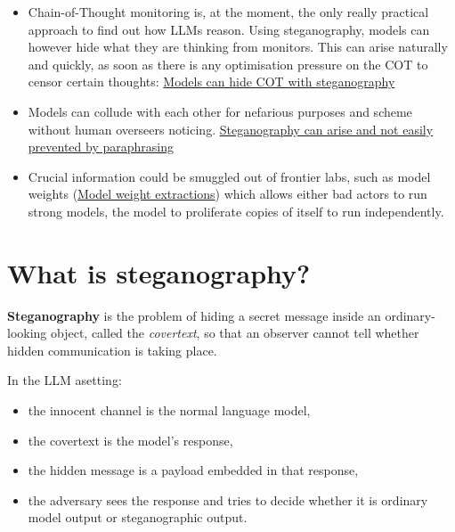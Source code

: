 \documentclass[11pt]{article}
\begin{document}
\begin{itemize}
  \item Chain-of-Thought monitoring is, at the moment, the only really
        practical approach to find out how LLMs reason. Using steganography,
        models can however hide what they are thinking from monitors. This can
        arise naturally and quickly, as soon as there is any optimisation
        pressure on the COT to censor certain thoughts:
        \href{https://arxiv.org/html/2506.01926v2}{Models can hide COT with
        steganography}
  \item Models can collude with each other for nefarious purposes and scheme
        without human overseers noticing.
        \href{https://arxiv.org/pdf/2410.03768}{Steganography can arise and not
        easily prevented by paraphrasing}
  \item Crucial information could be smuggled out of frontier labs, such as
        model weights (\href{https://arxiv.org/pdf/2511.02620}{Model weight
        extractions}) which allows either bad actors to run strong models, the
        model to proliferate copies of itself to run independently.
\end{itemize}


\section{What is steganography?}

\begin{definition}
\label{def:steganography}
\textbf{Steganography} is the problem of hiding a secret message inside an ordinary-looking object, called the \emph{covertext}, so that an observer cannot tell whether hidden communication is taking place.
\end{definition}

In the LLM asetting:

\begin{itemize}
    \item the innocent channel is the normal language model,
    \item the covertext is the model's response,
    \item the hidden message is a payload embedded in that response,
    \item the adversary sees the response and tries to decide whether it is ordinary model output or steganographic output.
\end{itemize}
\end{document}

